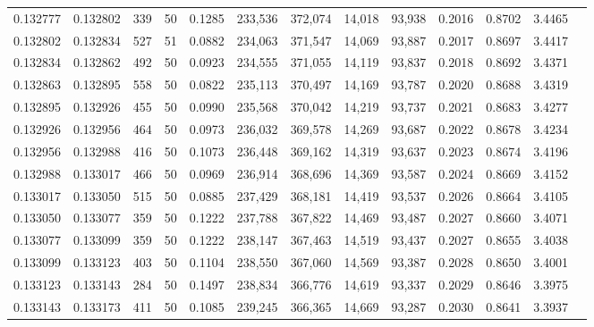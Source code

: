 \begin{tabular}{rrrrrrrrrrrrr}
0.132777 & 0.132802 &   339 &  50 &                                     0.1285 & 233,536 & 372,074 &  14,018 &  93,938 & 0.2016 & 0.8702 & 3.4465 \\
0.132802 & 0.132834 &   527 &  51 &                                     0.0882 & 234,063 & 371,547 &  14,069 &  93,887 & 0.2017 & 0.8697 & 3.4417 \\
0.132834 & 0.132862 &   492 &  50 &                                     0.0923 & 234,555 & 371,055 &  14,119 &  93,837 & 0.2018 & 0.8692 & 3.4371 \\
0.132863 & 0.132895 &   558 &  50 &                                     0.0822 & 235,113 & 370,497 &  14,169 &  93,787 & 0.2020 & 0.8688 & 3.4319 \\
0.132895 & 0.132926 &   455 &  50 &                                     0.0990 & 235,568 & 370,042 &  14,219 &  93,737 & 0.2021 & 0.8683 & 3.4277 \\
0.132926 & 0.132956 &   464 &  50 &                                     0.0973 & 236,032 & 369,578 &  14,269 &  93,687 & 0.2022 & 0.8678 & 3.4234 \\
0.132956 & 0.132988 &   416 &  50 &                                     0.1073 & 236,448 & 369,162 &  14,319 &  93,637 & 0.2023 & 0.8674 & 3.4196 \\
0.132988 & 0.133017 &   466 &  50 &                                     0.0969 & 236,914 & 368,696 &  14,369 &  93,587 & 0.2024 & 0.8669 & 3.4152 \\
0.133017 & 0.133050 &   515 &  50 &                                     0.0885 & 237,429 & 368,181 &  14,419 &  93,537 & 0.2026 & 0.8664 & 3.4105 \\
0.133050 & 0.133077 &   359 &  50 &                                     0.1222 & 237,788 & 367,822 &  14,469 &  93,487 & 0.2027 & 0.8660 & 3.4071 \\
0.133077 & 0.133099 &   359 &  50 &                                     0.1222 & 238,147 & 367,463 &  14,519 &  93,437 & 0.2027 & 0.8655 & 3.4038 \\
0.133099 & 0.133123 &   403 &  50 &                                     0.1104 & 238,550 & 367,060 &  14,569 &  93,387 & 0.2028 & 0.8650 & 3.4001 \\
0.133123 & 0.133143 &   284 &  50 &                                     0.1497 & 238,834 & 366,776 &  14,619 &  93,337 & 0.2029 & 0.8646 & 3.3975 \\
0.133143 & 0.133173 &   411 &  50 &                                     0.1085 & 239,245 & 366,365 &  14,669 &  93,287 & 0.2030 & 0.8641 & 3.3937 \\

\end{tabular}
